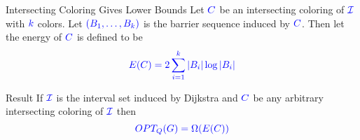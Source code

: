 \documentclass[10pt]{beamer}
\begin{document}
\begin{frame}{Intersecting Coloring Gives Lower Bounds}
	Let $\mathcolor{blue}{C}$ be an intersecting coloring of $\mathcolor{blue}{\mathcal{I}}$ with $\mathcolor{blue}{k}$ colors.
	Let $\mathcolor{blue}{(B_1,\dots, B_k)}$ is the barrier sequence induced by $\mathcolor{blue}{C}$. Then let the energy of $\mathcolor{blue}{C}$ is defined to be $$\mathcolor{blue}{E(C)=2\sum\limits_{i=1}^k|B_i|\log |B_i|}$$\pause
	\vfill

	\begin{alertblock}{Result}
		If $\mathcolor{blue}{\mathcal{I}}$ is the interval set induced by Dijkstra and $\mathcolor{blue}{C}$ be any arbitrary intersecting coloring of $\mathcolor{blue}{\mathcal{I}}$ then $$\mathcolor{blue}{OPT_Q(G)=\Omega(E(C))}$$
	\end{alertblock}
\end{frame}
\end{document}
